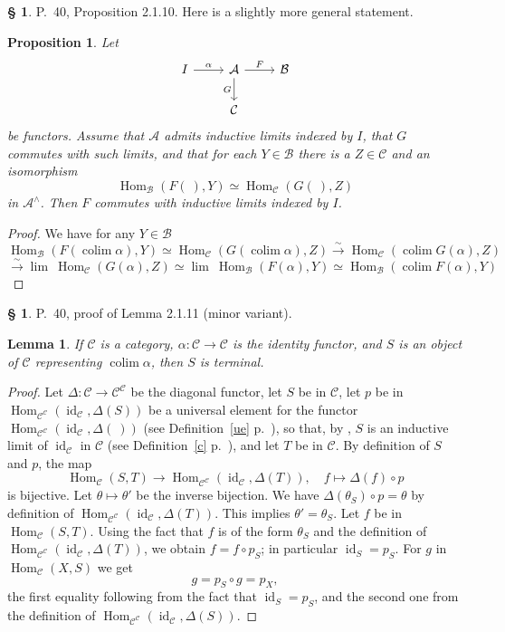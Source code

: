 \documentclass[12pt]{article}
\newtheorem{lem}[thm]{Lemma}
\newtheorem{prop}[thm]{Proposition}
\theoremstyle{remark}
\theoremstyle{definition}
\newtheorem{s}[thm]{\S}
\newcommand{\A}{\mathcal A}
\newcommand{\B}{\mathcal B}
\newcommand{\C}{\mathcal C}
\newcommand{\mv}{ (minor variant)}
\newcommand{\xr}{\xrightarrow}
\DeclareMathOperator*{\coli}{colim}
\DeclareMathOperator*{\co}{colim}
\DeclareMathOperator{\id}{id}
\DeclareMathOperator{\Hom}{Hom}%
\begin{document}
%
%
\begin{s} 
P.~40, Proposition 2.1.10. Here is a slightly more general statement. 
%
\begin{prop}\label{2.1.10}
Let 
$$
\begin{tikzcd}
I\ar{r}{\alpha}&\A\ar{d}[swap]{G}\ar{r}{F}&\B\\
&\C
\end{tikzcd}
$$
be functors. Assume that $\A$ admits inductive limits indexed by $I$, that $G$ commutes with such limits, and that for each $Y\in\B$ there is a $Z\in\C$ and an isomorphism 
$$
\Hom_\B(F(\ ),Y)\simeq\Hom_\C(G(\ ),Z)
$$
in $\A^\wedge$. Then $F$ commutes with inductive limits indexed by $I$.
\end{prop}
%
\begin{proof}
We have for any $Y\in\B$ 
$$ 
\Hom_\B\left(F\left(\coli\alpha\right),Y\right)\simeq
\Hom_\C\left(G\left(\coli\alpha\right),Z\right)
\xr\sim
\Hom_\C\left(\coli G(\alpha),Z\right)
$$
$$
\xr\sim\lim \ \Hom_\C(G(\alpha),Z)\simeq\lim \ \Hom_\B(F(\alpha),Y)\simeq\Hom_\B(\co F(\alpha),Y)
$$
\end{proof}
\end{s}
%
%
\begin{s} 
P.~40, proof of Lemma 2.1.11\mv.
%
\begin{lem} 
If $\C$ is a category, $\alpha:\C\to\C$ is the identity functor, and $S$ is an object of $\C$ representing $\coli\alpha$, then $S$ is terminal. 
\end{lem}
%
\begin{proof}
Let $\Delta:\C\to\C^\C$ be the diagonal functor, let $S$ be in $\C$, let $p$ be in $\Hom_{\C^\C}(\id_\C,\Delta(S))$ be a universal element for the functor $\Hom_{\C^\C}(\id_\C,\Delta(\ ))$ (see Definition~\ref{ue} p.~\pageref{ue}), so that, by , $S$ is an inductive limit of $\id_\C$ in $\C$ (see Definition~\ref{c} p.~\pageref{c}), and let $T$ be in $\C$. By definition of $S$ and $p$, the map 
$$
\Hom_\C(S,T)\to\Hom_{\C^\C}(\id_\C,\Delta(T)),\quad f\mapsto\Delta(f)\circ p 
$$ 
is bijective. Let $\theta\mapsto\theta'$ be the inverse bijection. We have $\Delta(\theta_S)\circ p=\theta$ by definition of $\Hom_{\C^\C}(\id_\C,\Delta(T))$. This implies $\theta'=\theta_S$. Let $f$ be in $\Hom_\C(S,T)$. Using the fact that $f$ is of the form $\theta_S$ and the definition of $\Hom_{\C^\C}(\id_\C,\Delta(T))$, we obtain $f=f\circ p_S$; in particular $\id_S=p_S$. For $g$ in $\Hom_\C(X,S)$ we get 
$$
g=p_S\circ g=p_X,
$$
the first equality following from the fact that $\id_S=p_S$, and the second one from the definition of $\Hom_{\C^\C}(\id_\C,\Delta(S))$.
\end{proof}
\end{s}
\end{document}
